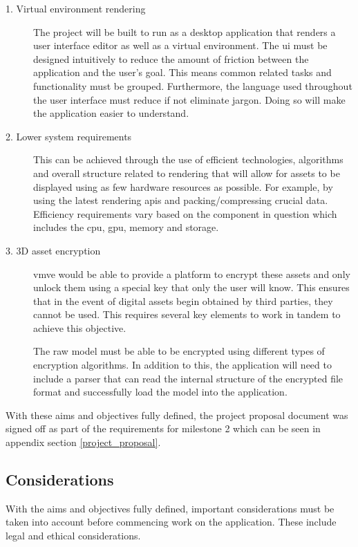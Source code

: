 \documentclass[11pt]{article}
\begin{document}
\begin{description}
  \item[1. Virtual environment rendering] 
    The project will be built to run as a desktop application that renders a user
    interface editor as well as a virtual environment. The \gls*{ui} must be
    designed intuitively to reduce the amount of friction between the application
    and the user's goal. This means common related tasks and functionality must be
    grouped. Furthermore, the language used throughout the user interface must
    reduce if not eliminate jargon. Doing so will make the application easier to
    understand.

  \item[2. Lower system requirements]
    This can be achieved through the use of efficient technologies, algorithms
    and overall structure related to rendering that will allow for assets to be
    displayed using as few hardware resources as possible. For example, by
    using the latest rendering \glspl*{api} and packing/compressing crucial
    data. Efficiency requirements vary based on the component in question which
    includes the \gls*{cpu}, \gls*{gpu}, memory and storage. 


  \item[3. 3D asset encryption]
    \gls*{vmve} would be able to provide a platform to encrypt these assets and
    only unlock them using a special key that only the user will know. This
    ensures that in the event of digital assets begin obtained by third parties,
    they cannot be used. This requires several key elements to work in tandem to
    achieve this objective.
    
    The raw model must be able to be encrypted using different types of
    encryption algorithms. In addition to this, the application will need to
    include a parser that can read the internal structure of the encrypted file
    format and successfully load the model into the application.
\end{description}

With these aims and objectives fully defined, the project proposal document was
signed off as part of the requirements for milestone 2 which can be seen in
appendix section \ref{project_proposal}.



\subsection{Considerations}
With the aims and objectives fully defined, important considerations must be
taken into account before commencing work on the application. These include
legal and ethical considerations.
\end{document}
